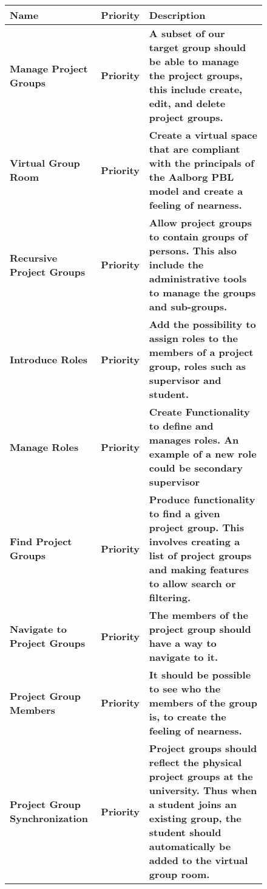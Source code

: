 \begin{figure}%
\begin{tabular}{|p{}|p{}|p{}|}
	\hline
	
	\textbf{Name} & \textbf{Priority} & \textbf{Description} \\
	\hline
	\textbf{Manage Project Groups} & \textbf{Priority} & \textbf{A subset of our target group should be able to manage the project groups, this include create, edit, and delete project groups. } \\
	\hline
	\textbf{Virtual Group Room} & \textbf{Priority} & \textbf{Create a virtual space that are compliant with the principals of the Aalborg PBL model and create a feeling of nearness. } \\
	\hline
	\textbf{Recursive Project Groups} & \textbf{Priority} & \textbf{Allow project groups to contain groups of persons. This also include the administrative tools to manage the groups and sub-groups.} \\
	\hline
	\textbf{Introduce Roles} & \textbf{Priority} & \textbf{Add the possibility to assign roles to the members of a project group, roles such as supervisor and student.  } \\
	\hline
	\textbf{Manage Roles} & \textbf{Priority} & \textbf{Create Functionality to define and manages roles. An example of a new role  could be secondary supervisor} \\
	\hline
	\textbf{Find Project Groups} & \textbf{Priority} & \textbf{Produce functionality to find a given project group. This involves creating a list of project groups and making features to allow search or filtering.} \\
	\hline

	\textbf{Navigate to Project Groups} & \textbf{Priority} & \textbf{The members of the project group should have a way to navigate to it.} \\
	\hline
	\textbf{Project Group Members} & \textbf{Priority} & \textbf{It should be possible to see who the members of the group is, to create the feeling of nearness.} \\
	\hline
	\textbf{Project Group Synchronization} & \textbf{Priority} & \textbf{Project groups should reflect the physical project groups at the university. Thus when a student joins an existing group, the student should automatically be added to the virtual group room. } \\
	\hline 


	
	
	
\end{tabular}
\label{fig:productbacklog}
\end{figure}


